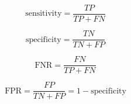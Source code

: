 \begin{equation} \label{eq:sensitivity}
\text{sensitivity} = \frac{TP}{TP + FN}
\end{equation}

\begin{equation} \label{eq:specificity}
\text{specificity} = \frac{TN}{TN + FP}
\end{equation}

\begin{equation} \label{eq:FNR}
\text{FNR} = \frac{FN}{TP + FN}
\end{equation}

\begin{equation} \label{eq:FPR}
\text{FPR} = \frac{FP}{TN + FP} = 1 - \text{specificity}
\end{equation}




